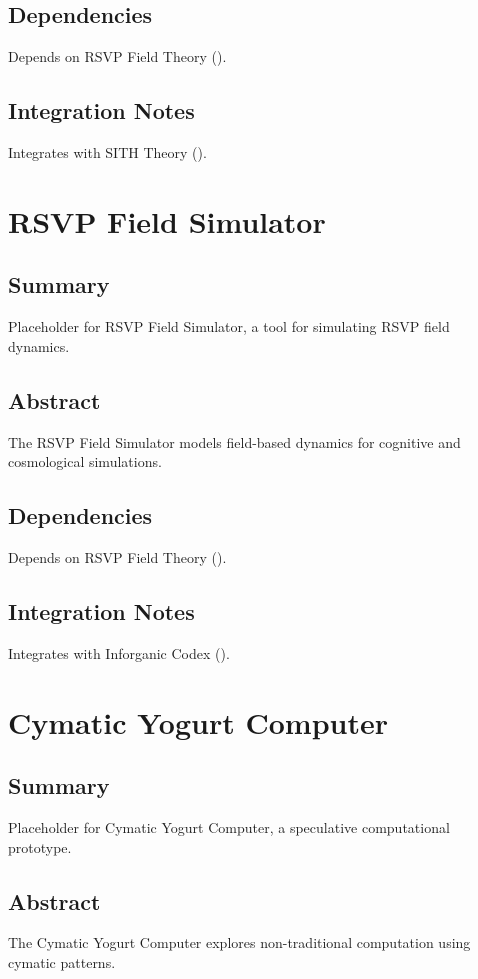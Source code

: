 \documentclass[11pt,oneside]{memoir}
\theoremstyle{plain}
\begin{document}
\section{Dependencies}
Depends on RSVP Field Theory ().

\section{Integration Notes}
Integrates with SITH Theory ().

\chapter{RSVP Field Simulator}
\label{sec:rsvp_simulator}
\section{Summary}
Placeholder for RSVP Field Simulator, a tool for simulating RSVP field dynamics.

\section{Abstract}
The RSVP Field Simulator models field-based dynamics for cognitive and cosmological simulations.

\section{Dependencies}
Depends on RSVP Field Theory ().

\section{Integration Notes}
Integrates with Inforganic Codex ().

\chapter{Cymatic Yogurt Computer}
\label{sec:cymatic_yogurt}
\section{Summary}
Placeholder for Cymatic Yogurt Computer, a speculative computational prototype.

\section{Abstract}
The Cymatic Yogurt Computer explores non-traditional computation using cymatic patterns.
\end{document}
